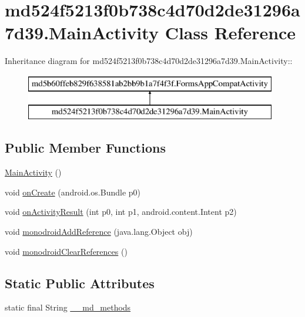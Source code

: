 \hypertarget{classmd524f5213f0b738c4d70d2de31296a7d39_1_1_main_activity}{
\section{md524f5213f0b738c4d70d2de31296a7d39.MainActivity Class Reference}
\label{classmd524f5213f0b738c4d70d2de31296a7d39_1_1_main_activity}
}
Inheritance diagram for md524f5213f0b738c4d70d2de31296a7d39.MainActivity::\begin{figure}[H]
\begin{center}
\leavevmode
\includegraphics[height=2cm]{classmd524f5213f0b738c4d70d2de31296a7d39_1_1_main_activity}
\end{center}
\end{figure}
\subsection*{Public Member Functions}
\begin{CompactItemize}
\item 
\hyperlink{classmd524f5213f0b738c4d70d2de31296a7d39_1_1_main_activity_d67212f116f053a8ffe461e523a96d1b}{MainActivity} ()
\item 
void \hyperlink{classmd524f5213f0b738c4d70d2de31296a7d39_1_1_main_activity_94ab3f430f87543996addad12cb41fda}{onCreate} (android.os.Bundle p0)
\item 
void \hyperlink{classmd524f5213f0b738c4d70d2de31296a7d39_1_1_main_activity_36576989c07e54a702c70fb7649638cd}{onActivityResult} (int p0, int p1, android.content.Intent p2)
\item 
void \hyperlink{classmd524f5213f0b738c4d70d2de31296a7d39_1_1_main_activity_c001ac4bc7c7713ba23345add551eb87}{monodroidAddReference} (java.lang.Object obj)
\item 
void \hyperlink{classmd524f5213f0b738c4d70d2de31296a7d39_1_1_main_activity_f04a2a3f5702e57b79b001a0d63ef0d8}{monodroidClearReferences} ()
\end{CompactItemize}
\subsection*{Static Public Attributes}
\begin{CompactItemize}
\item 
static final String \hyperlink{classmd524f5213f0b738c4d70d2de31296a7d39_1_1_main_activity_0700c8dda689213437fb119dde5ff411}{\_\-\_\-md\_\-methods}
\end{CompactItemize}
